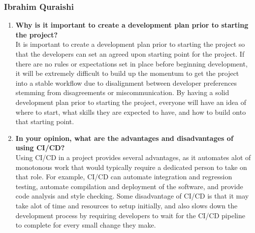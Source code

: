 \documentclass{article}
\begin{document}
\subsubsection*{Ibrahim Quraishi}
\begin{enumerate}
    \item \textbf{Why is it important to create a development plan prior to starting the
    project?}\\

    It is important to create a development plan prior to starting the project so that the developers can set an agreed upon starting point for the project. If there are no rules or expectations set in place before beginning development, it will be extremely difficult to build up the momentum to get the project into a stable workflow due to disalignment between developer preferences stemming from disagreements or miscommunication. By having a solid development plan prior to starting the project, everyone will have an idea of where to start, what skills they are expected to have, and how to build onto that starting point.

    \item \textbf{In your opinion, what are the advantages and disadvantages of using
    CI/CD?}\\

    Using CI/CD in a project provides several advantages, as it automates alot of monotonous work that would typically require a dedicated person to take on that role. For example, CI/CD can automate integration and regression testing, automate compilation and deployment of the software, and provide code analysis and style checking. Some disadvantage of CI/CD is that it may take alot of time and resources to setup initially, and also slows down the development process by requiring developers to wait for the CI/CD pipeline to complete for every small change they make.
\end{enumerate}
\end{document}
